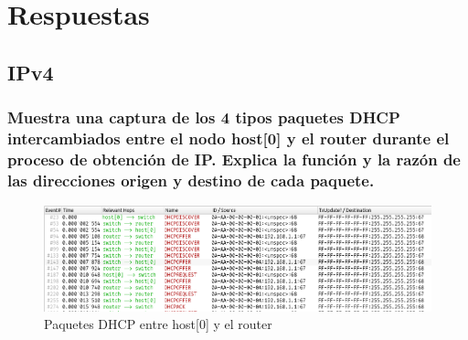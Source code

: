 \chapter{Respuestas}
\label{chap:respuestas}
\section{IPv4}
\subsection{Muestra una captura de los 4 tipos paquetes DHCP intercambiados entre el nodo host[0] y el router durante el proceso de obtención de IP. Explica la función y la razón de las direcciones origen y destino de cada paquete.}

\begin{figure}[h]
    \centering
    \includegraphics[width=\textwidth]{img/ej1.1.png}
    \caption{Paquetes DHCP entre host[0] y el router}
    \label{fig:ej1.1}
\end{figure}

